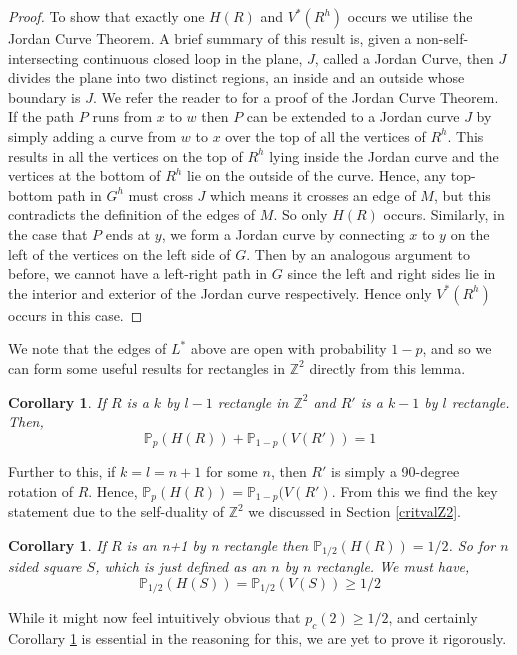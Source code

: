 \documentclass[a4paper,11pt]{article}
\newtheorem{corollary}[theorem]{Corollary}
\theoremstyle{definition}
\newcommand{\ints}{\mathbb{Z}}
\newcommand{\prob}{\mathbb{P}_p}
\begin{document}
\begin{proof}
	To show that exactly one  $H(R)$ and $V^*(R^h)$ occurs we utilise the Jordan Curve Theorem. A brief summary of this result is, given a non-self-intersecting continuous closed loop in the plane, $J$, called a Jordan Curve, then $J$ divides the plane into two distinct regions, an inside and an outside whose boundary is $J$. We refer the reader to \cite{kosniowski_1980} for a proof of the Jordan Curve Theorem. If the path $P$ runs from $x$ to $w$ then $P$ can be extended to a Jordan curve $J$ by simply adding a curve from $w$ to $x$ over the top of all the vertices of $R^h$. This results in all the vertices on the top of $R^h$ lying inside the Jordan curve and the vertices at the bottom of $R^h$ lie on the outside of the curve. Hence, any top-bottom path in $G^h$ must cross $J$ which means it crosses an edge of $M$, but this contradicts the definition of the edges of $M$. So only $H(R)$ occurs.
	Similarly, in the case that $P$ ends at $y$, we form a Jordan curve by connecting $x$ to $y$ on the left of the vertices on the left side of $G$. Then by an analogous argument to before, we cannot have a left-right path in $G$ since the left and right sides lie in the interior and exterior of the Jordan curve respectively. Hence only $V^*(R^h)$ occurs in this case.
\end{proof}

We note that the edges of $L^*$ above are open with probability $1-p$, and so we can form some useful results for rectangles in $\ints^2$ directly from this lemma.

\begin{corollary}
	If $R$ is a $k$ by $l-1$ rectangle in $\ints^2$ and $R'$ is a $k-1$ by $l$ rectangle. Then,
	$$\prob(H(R))+\mathbb{P}_{1-p}(V(R')) = 1 $$
\end{corollary}

Further to this, if $k = l = n+1$ for some $n$, then $R'$ is simply a 90-degree rotation of $R$. Hence, $\prob(H(R)) = \mathbb{P}_{1-p}(V(R')$. From this we find the key statement due to the self-duality of $\ints^2$ we discussed in Section \ref*{critvalZ2}.

\begin{corollary}\label{squareGEQhalf}
	If $R$ is an n+1 by n rectangle then $\mathbb{P}_{1/2}(H(R)) = 1/2$. So for $n$ sided square $S$, which is just defined as an $n$ by $n$ rectangle. We must have,
	$$\mathbb{P}_{1/2}(H(S))=\mathbb{P}_{1/2}(V(S)) \geq 1/2$$
\end{corollary}

While it might now feel intuitively obvious that $p_c(2) \geq 1/2$, and certainly Corollary \ref*{squareGEQhalf} is essential in the reasoning for this, we are yet to prove it rigorously.
\end{document}

